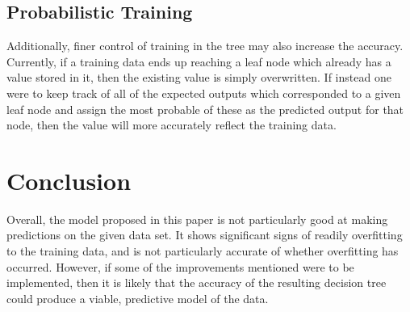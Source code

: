 \documentclass{article}
\begin{document}
	\subsection{Probabilistic Training}
	Additionally, finer control of training in the tree may also increase the accuracy. Currently, if a training data ends up reaching a leaf node which already has a value stored in it, then the existing value is simply overwritten. If instead one were to keep track of all of the expected outputs which corresponded to a given leaf node and assign the most probable of these as the predicted output for that node, then the value will more accurately reflect the training data.
	
	\clearpage
	\section{Conclusion}
	Overall, the model proposed in this paper is not particularly good at making predictions on the given data set. It shows significant signs of readily overfitting to the training data, and is not particularly accurate of whether overfitting has occurred. However, if some of the improvements mentioned were to be implemented, then it is likely that the accuracy of the resulting decision tree could produce a viable, predictive model of the data.

	
	
\end{document}

